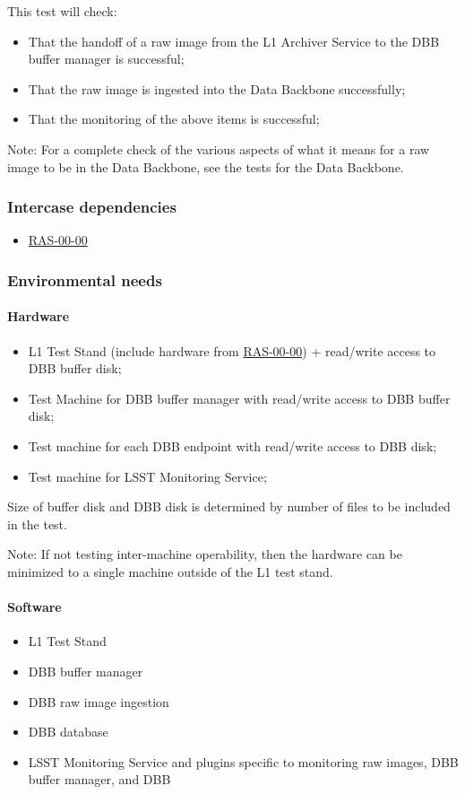 \documentclass[DM,lsstdraft,STS,toc]{lsstdoc}
\begin{document}
This test will check:
\begin{itemize}
\item{That the handoff of a raw image from the L1 Archiver Service to the DBB buffer
manager is successful;}
\item{That the raw image is ingested into the Data Backbone successfully;}
\item{That the monitoring of the above items is successful;}
\end{itemize}


Note: For a complete check of the various aspects of what it means for
a raw image to be in the Data Backbone, see the tests for the Data Backbone.

\subsubsection{Intercase dependencies}
\begin{itemize}
\item{\hyperref[ras-00-00]{RAS-00-00}}
\end{itemize}


\subsubsection{Environmental needs}
\paragraph{Hardware}
\begin{itemize}
\item{L1 Test Stand (include hardware from \hyperref[ras-00-00]{RAS-00-00}) + read/write access to DBB buffer disk;}
\item{Test Machine for DBB buffer manager with read/write access to DBB buffer disk;}
\item{Test machine for each DBB endpoint with read/write access to DBB disk;}
\item{Test machine for LSST Monitoring Service;}
\end{itemize}


Size of buffer disk and DBB disk is determined by number of files to be included in the test.


Note: If not testing inter-machine operability, then the hardware can be minimized
to a single machine outside of the L1 test stand.


\paragraph{Software}
\begin{itemize}
\item{L1 Test Stand}
\item{DBB buffer manager}
\item{DBB raw image ingestion}
\item{DBB database}
\item{LSST Monitoring Service and plugins specific to monitoring raw images, DBB buffer manager, and DBB}
\end{itemize}
\end{document}

